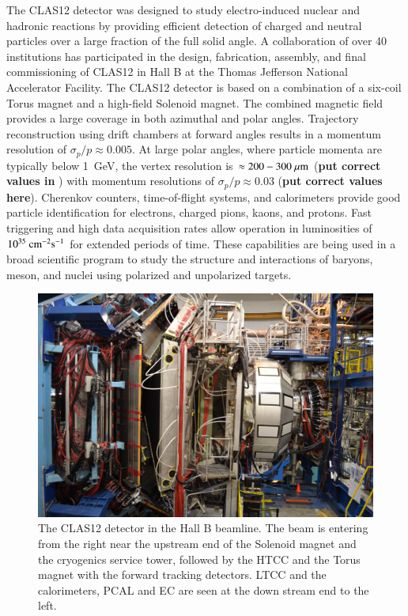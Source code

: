 \documentclass[final,3p,twocolumn]{elsarticle}
\begin{document}
The CLAS12 detector was designed to study electro-induced nuclear and hadronic reactions by providing efficient detection of charged and neutral particles over a large fraction of the full solid angle. A collaboration of over 40 institutions has participated in the design, fabrication, assembly, and final commissioning of CLAS12 in Hall B at the Thomas Jefferson  National Accelerator Facility. The CLAS12 detector is based on a combination of a six-coil Torus magnet and a high-field Solenoid magnet. The combined magnetic field provides a large coverage in both azimuthal and polar angles. Trajectory reconstruction using drift chambers at forward angles results in a momentum resolution of ${\sigma_p / p} \approx 0.005$. At large polar angles, where particle momenta are typically below 1~GeV, the vertex resolution is $\approx 200-300~\mu\rm{m}$ ({\bf put correct values in} ) with momentum resolutions of $\sigma_p / p \approx 0.03$  ({\bf put correct values here}).  Cherenkov counters, time-of-flight systems, and calorimeters provide good particle identification for electrons, charged pions, kaons, and protons. Fast triggering and high data acquisition rates allow operation in luminosities of $10^{35}~\rm{cm}^{-2}\rm{s}^{-1}$ for extended periods of time. These capabilities are being used in a broad scientific program to study the structure and interactions of baryons, meson, and nuclei using polarized and unpolarized targets. 

\begin{figure}[bhtp!]
\centerline{\includegraphics[width=1.4\columnwidth]{CLAS12_photo-1.jpg}}
\caption{The CLAS12 detector in the Hall B beamline. The beam is entering from the right near the upstream
  end of the Solenoid magnet and the cryogenics service tower, followed by the HTCC and the Torus magnet with the forward
  tracking detectors.  LTCC and the calorimeters, PCAL and EC are seen at the down stream end to the left.}
\label{clas12-photo}
\end{figure}
\end{document}
